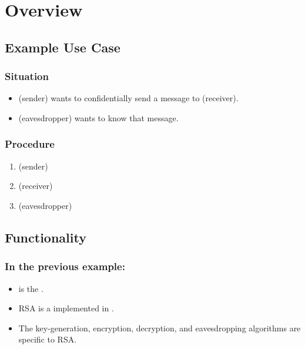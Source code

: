 \section{Overview}

\frame{\sectionpage}


\subsection{Example Use Case}

\frame{\subsectionpage}

\begin{frame}
\frametitle{Situation}
\begin{itemize}
\item
  \alice{} (sender) wants to confidentially send a message
  to \bob{} (receiver).
\item
  \eve{} (eavesdropper) wants to know that message.
\end{itemize}
\end{frame}

\begin{frame}
\frametitle{Procedure}
\begin{enumerate}
\item
  \alice{} (sender) \encryptex
\item
  \bob{} (receiver) \decryptex
\item
  \eve{} (eavesdropper) \eavesdropex
\end{enumerate}
\end{frame}


\subsection{Functionality}

\frame{\subsectionpage}

\begin{frame}
\frametitle{In the previous example:}
\begin{itemize}
\item
  \cry{} is the \cf.
\item
  RSA is a \cs{} implemented in \cry.
\item
  The key-generation, encryption, decryption,
  and eavesdropping algorithms are specific to RSA.
\end{itemize}
\end{frame}

